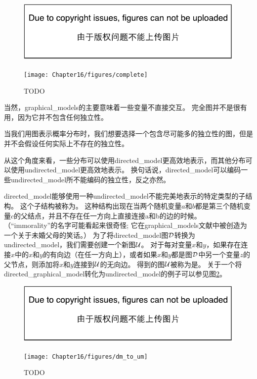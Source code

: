 \begin{figure}[!htb]
\ifOpenSource
\centerline{\includegraphics{figure.pdf}}
\else
	\centerline{\texttt{[image: Chapter16/figures/complete]}}	
\fi
	\caption{TODO}
	\label{fig:complete}
\end{figure}


当然，\gls{graphical_models}的主要意味着一些变量不直接交互。 
完全图并不是很有用，因为它并不包含任何独立性。


当我们用图表示概率分布时，我们想要选择一个包含尽可能多的独立性的图，但是并不会假设任何实际上不存在的独立性。


从这个角度来看，一些分布可以使用\gls{directed_model}更高效地表示，而其他分布可以使用\gls{undirected_model}更高效地表示。
换句话说，\gls{directed_model}可以编码一些\gls{undirected_model}所不能编码的独立性，反之亦然。


\gls{directed_model}能够使用一种\gls{undirected_model}不能完美地表示的特定类型的子结构。
这个子结构被称为。
这种结构出现在当两个随机变量$a$和$b$都是第三个随机变量$c$的父结点，并且不存在任一方向上直接连接a和b的边的时候。
（``\gls{immorality}''的名字可能看起来很奇怪; 它在\gls{graphical_models}文献中被创造为一个关于未婚父母的笑话。）
为了将\gls{directed_model}图$\mathcal{D}$转换为\gls{undirected_model}，我们需要创建一个新图$\mathcal{U}$。
对于每对变量$x$和$y$，如果存在连接$x$中的$x$和$y$的有向边（在任一方向上），或者如果$x$和$y$都是图$\mathcal{D}$中另一个变量$z$的父节点，则添加将$x$和$y$连接到$\mathcal{U}$的无向边。 
得到的图$\mathcal{U}$被称为是。
关于一个将\gls{directed_graphical_model}转化为\gls{undirected_model}的例子可以参见图\ref{fig:dm_to_um}。


\begin{figure}[!htb]
\ifOpenSource
\centerline{\includegraphics{figure.pdf}}
\else
	\centerline{\texttt{[image: Chapter16/figures/dm\_to\_um]}}	
\fi
	\caption{TODO}
	\label{fig:dm_to_um}
\end{figure}



